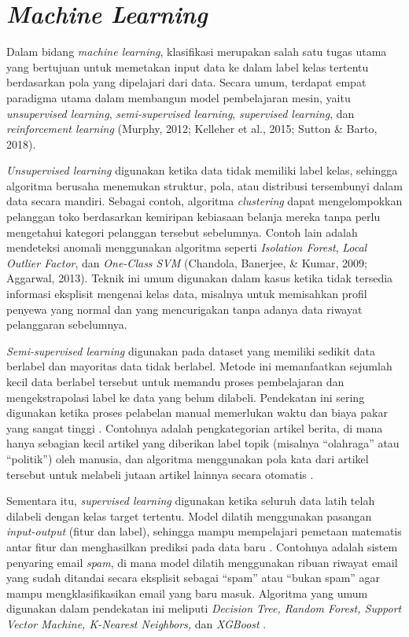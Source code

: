 \section{\textit{Machine Learning}}\label{sec:machine_learning}

Dalam bidang \textit{machine learning}, klasifikasi merupakan salah satu tugas utama yang bertujuan untuk memetakan input data ke dalam label kelas tertentu berdasarkan pola yang dipelajari dari data. Secara umum, terdapat empat paradigma utama dalam membangun model pembelajaran mesin, yaitu \textit{unsupervised learning}, \textit{semi-supervised learning}, \textit{supervised learning}, dan \textit{reinforcement learning} (Murphy, 2012; Kelleher et al., 2015; Sutton \& Barto, 2018).

\textit{Unsupervised learning} digunakan ketika data tidak memiliki label kelas, sehingga algoritma berusaha menemukan struktur, pola, atau distribusi tersembunyi dalam data secara mandiri. Sebagai contoh, algoritma \textit{clustering} dapat mengelompokkan pelanggan toko berdasarkan kemiripan kebiasaan belanja mereka tanpa perlu mengetahui kategori pelanggan tersebut sebelumnya. Contoh lain adalah mendeteksi anomali menggunakan algoritma seperti \textit{Isolation Forest}, \textit{Local Outlier Factor}, dan \textit{One-Class SVM} (Chandola, Banerjee, \& Kumar, 2009; Aggarwal, 2013). Teknik ini umum digunakan dalam kasus ketika tidak tersedia informasi eksplisit mengenai kelas data, misalnya untuk memisahkan profil penyewa yang normal dan yang mencurigakan tanpa adanya data riwayat pelanggaran sebelumnya.

\textit{Semi-supervised learning} digunakan pada dataset yang memiliki sedikit data berlabel dan mayoritas data tidak berlabel. Metode ini memanfaatkan sejumlah kecil data berlabel tersebut untuk memandu proses pembelajaran dan mengekstrapolasi label ke data yang belum dilabeli. Pendekatan ini sering digunakan ketika proses pelabelan manual memerlukan waktu dan biaya pakar yang sangat tinggi \cite{chapelle2006semi}. Contohnya adalah pengkategorian artikel berita, di mana hanya sebagian kecil artikel yang diberikan label topik (misalnya ``olahraga'' atau ``politik'') oleh manusia, dan algoritma menggunakan pola kata dari artikel tersebut untuk melabeli jutaan artikel lainnya secara otomatis \cite{zhu2008semi}.

Sementara itu, \textit{supervised learning} digunakan ketika seluruh data latih telah dilabeli dengan kelas target tertentu. Model dilatih menggunakan pasangan \textit{input-output} (fitur dan label), sehingga mampu mempelajari pemetaan matematis antar fitur dan menghasilkan prediksi pada data baru \cite{james2013introduction}. Contohnya adalah sistem penyaring email \textit{spam}, di mana model dilatih menggunakan ribuan riwayat email yang sudah ditandai secara eksplisit sebagai ``spam'' atau ``bukan spam'' agar mampu mengklasifikasikan email yang baru masuk. Algoritma yang umum digunakan dalam pendekatan ini meliputi \textit{Decision Tree, Random Forest, Support Vector Machine, K-Nearest Neighbors,} dan \textit{XGBoost} \cite{tan2019introduction}.

